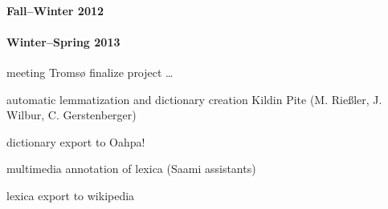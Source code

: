 \documentclass[a4paper,12pt]{article}
\begin{document}
{{{{\paragraph{Fall–Winter 2012}

\paragraph{Winter–Spring 2013}
meeting Tromsø
finalize project
…

automatic lemmatization and dictionary creation Kildin Pite (M. Rießler, J. Wilbur, C. Gerstenberger)

dictionary export to Oahpa!

multimedia annotation of lexica (Saami assistants)

lexica export to wikipedia

}}}}
\end{document}

